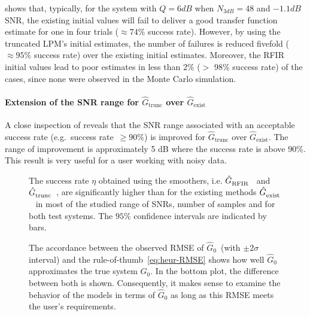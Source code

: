    shows that, typically, for the system with $Q=6\unit{dB}$ when $N_{3\unit{dB}}=48$ and $-1.1 \unit{dB}$ \gls{SNR}, the existing initial values will fail to deliver a good transfer function estimate for one in four trials ($\approx 74\%$ success rate).
However, by using the truncated \gls{LPM}'s initial estimates, the number of failures is reduced fivefold ($\approx 95\%$ success rate) over the existing initial estimates.
Moreover, the \gls{RFIR} initial values lead to poor estimates in less than $2\%$ ($>$ $98\%$ success rate) of the cases, since none were observed in the Monte Carlo simulation.

\paragraph*{Extension of the SNR range for $\hat G_\mathrm{trunc}$ over $\hat G_\mathrm{exist}$}
A close inspection of  reveals that the \gls{SNR} range associated with an acceptable success rate (e.g.\ success rate~$\geqslant 90\%$) is improved for $\hat G_\mathrm{trunc}$ over $\hat G_\mathrm{exist}$. The range of improvement is approximately 5 dB where the success rate is above $90\%$. This result is very useful for a user working with noisy data.

\begin{figure}
  \centering
  \setlength{\figurewidth}{0.85\columnwidth}
  \setlength{\figureheight}{0.68\figurewidth}
  
 \caption[Simulated success rate of the different initialization schemes for varying \gls{SNR}.]{The success rate $\eta$  obtained using the smoothers, i.e. $\hat{G}_{\mathrm{RFIR}}^{\mathrm{}}$~ and $\hat{G}_{\mathrm{trunc}}^{\mathrm{}}$~, are significantly higher than for the existing methods $\hat{G}_{\mathrm{exist}}^{\mathrm{}}$~ in most of the studied range of \glspl{SNR}, number of samples and for both test systems. The $95\%$ confidence intervals are indicated by bars.}
  \label{fig:successRateVS_SNR36N3dB}
\end{figure}

\begin{figure}
  \centering
  \setlength{\figurewidth}{0.66\columnwidth}
  \setlength{\figureheight}{0.68\figurewidth}
  
 \caption[Simulated model \gls{RMSE} compared to rule-of-thumb.]{The accordance between the observed \gls{RMSE} of $\hat{G}_0$~(with $\pm2\sigma$ interval) and the rule-of-thumb~\eqref{eq:heur-RMSE} shows how well $\hat{G}_0$ approximates the true system $G_0$.
 In the bottom plot, the difference between both is shown.
 Consequently, it makes sense to examine the behavior of the models in terms of $\hat{G}_0$ as long as this RMSE meets the user's requirements.}
  \label{fig:RMSE}
\end{figure}

